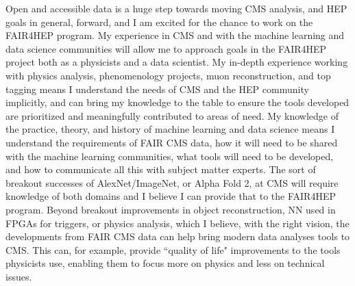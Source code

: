 \documentclass[11pt]{article}
\begin{document}

Open and accessible data is a huge step towards moving CMS analysis, and HEP goals in general, forward, and I am excited for the chance to work on the FAIR4HEP program. My experience in CMS and with the machine learning and data science communities will allow me to approach goals in the FAIR4HEP project both as a physicists and a data scientist. My in-depth experience working with physics analysis, phenomenology projects, muon reconstruction, and top tagging means I understand the needs of CMS and the HEP community implicitly, and can bring my knowledge to the table to ensure the tools developed are prioritized and meaningfully contributed to areas of need. My knowledge of the practice, theory, and history of machine learning and data science means I understand the requirements of FAIR CMS data, how it will need to be shared with the machine learning communities, what tools will need to be developed, and how to communicate all this with subject matter experts. The sort of breakout successes of AlexNet/ImageNet, or Alpha Fold 2, at CMS will require knowledge of both domains and I believe I can provide that to the FAIR4HEP program. Beyond breakout improvements in object reconstruction, NN used in FPGAs for triggers, or physics analysis, which I believe, with the right vision, the developments from FAIR CMS data can help bring modern data analyses tools to CMS. This can, for example, provide ``quality of life" improvements to the tools physicists use, enabling them to focus more on physics and less on technical issues. 


\end{document}
